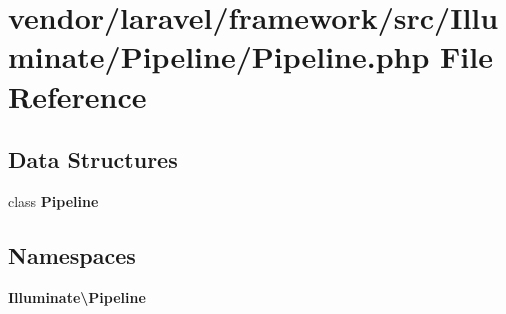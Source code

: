 \section{vendor/laravel/framework/src/\+Illuminate/\+Pipeline/\+Pipeline.php File Reference}
\label{_pipeline_2_pipeline_8php}
\subsection*{Data Structures}
\begin{DoxyCompactItemize}
\item 
class {\bf Pipeline}
\end{DoxyCompactItemize}
\subsection*{Namespaces}
\begin{DoxyCompactItemize}
\item 
 {\bf Illuminate\textbackslash{}\+Pipeline}
\end{DoxyCompactItemize}
